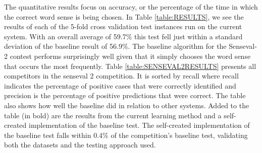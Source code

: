 The quantitative results focus on accuracy, or the percentage of the time in which
the correct word sense is being chosen.
In Table \ref{table:RESULTS}, we see the results of each of the 5-fold cross
validation test instances run on the current system.  With an overall average of
59.7\% this test fell just within a standard deviation of the baseline result of
56.9\%. The baseline algorithm for the Senseval-2 contest performs surprisingly
well given that it simply chooses the word sense that occurs the most frequently. Table \ref{table:SENSEVAL2RESULTS} presents all competitors in the senseval 2 
competition.  It is sorted by recall where recall indicates the percentage of 
positive cases that were correctly identified and precision is the percentage 
of positive predictions that were correct.  The table also shows how well the 
baseline did in  relation to other systems. Added to the table (in bold) are the results from the current learning method and a self-created implementation of the baseline test. The self-created implementation of the baseline test falls within 0.4\% of the competition's baseline test, validating both the datasets and the testing
approach used.

